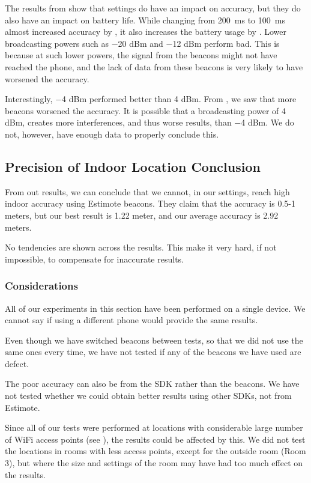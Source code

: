 The results from  show that settings do have an impact on accuracy,
but they do also have an impact on battery life. 
While changing from \SI{200}{\milli\second} to \SI{100}{\milli\second} almost increased accuracy by ,
it also increases the battery usage by .
Lower broadcasting powers such as \num{-20} dBm and \num{-12} dBm perform bad. 
This is because at such lower powers, 
the signal from the beacons might not have reached the phone, 
and the lack of data from these beacons is very likely to have worsened the accuracy.

Interestingly, \num{-4} dBm performed better than \num{4} dBm.
From , we saw that more beacons worsened the accuracy. 
It is possible that a broadcasting power of \num{4} dBm,
creates more interferences, and thus worse results, than \num{-4} dBm. 
We do not, however, have enough data to properly conclude this. 

\subsection{Precision of Indoor Location Conclusion}
From out results, we can conclude that we cannot, 
in our settings, reach high indoor accuracy using Estimote beacons. 
They claim that the accuracy is \num{0.5}-\num{1} meters, 
but our best result is \num{1.22} meter, 
and our average accuracy is \num{2.92} meters. 

No tendencies are shown across the results. 
This make it very hard, if not impossible,
to compensate for inaccurate results.  

\subsubsection{Considerations}
All of our experiments in this section have been performed on a single device.
We cannot say if using a different phone would provide the same results. 

Even though we have switched beacons between tests, 
so that we did not use the same ones every time, 
we have not tested if any of the beacons we have used are defect. 

The poor accuracy can also be from the SDK rather than the beacons. 
We have not tested whether we could obtain better results using other SDKs, 
not from Estimote. 

Since all of our tests were performed at locations with considerable large number of WiFi access points (see ),
the results could be affected by this. 
We did not test the locations in rooms with less access points, 
except for the outside room (Room 3), 
but where the size and settings of the room may have had too much effect on the results.